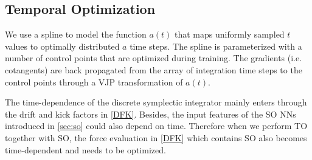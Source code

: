 \documentclass[usenatbib]{mnras}
\begin{document}
\subsection{Temporal Optimization}
\label{sec:to}

We use a spline to model the function $a(t)$ that maps uniformly sampled $t$
values to optimally distributed $a$ time steps.
The spline is parameterized with a number of control points that are optimized
during training.
The gradients (i.e. cotangents) are back propagated from the array of
integration time steps to the control points through a VJP transformation of
$a(t)$.

The time-dependence of the discrete symplectic integrator mainly enters through
the drift and kick factors in \eqref{DFK}.
Besides, the input features of the SO NNs introduced in \autoref{sec:so} could
also depend on time.
Therefore when we perform TO together with SO, the force evaluation in
\eqref{DFK} which contains SO also becomes time-dependent and needs to be
optimized.
\end{document}
